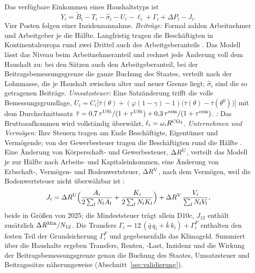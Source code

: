 Das verfügbare Einkommen eines Haushaltstyps ist
\begin{equation}
  Y_i = \tilde B_i - T_i - \hat\sigma_i - U_i - \ell_i + \Gamma_i + \Delta P_i - J_i .
  \label{eq:netto}
\end{equation}
Vier Posten folgen einer Inzidenzannahme. \emph{Beiträge:} Formal zahlen
Arbeitnehmer und Arbeitgeber je die Hälfte. Langfristig tragen die
Beschäftigten in Kontinentaleuropa rund zwei Drittel auch des
Arbeitgeberanteils \parencite{melguizo2013}. Das Modell lässt das Niveau beim
Arbeitnehmeranteil und rechnet jede Änderung voll dem Haushalt zu: bei den Sätzen
auch den Arbeitgeberanteil, bei der Beitragsbemessungsgrenze die ganze Buchung des
Staates, verteilt nach der Lohnmasse, die je Haushalt zwischen alter und neuer
Grenze liegt; $\hat\sigma_i$ sind die so getragenen Beiträge. \emph{Umsatzsteuer:} Eine Satzänderung trifft die volle
Bemessungsgrundlage,
$U_i = C_i\bigl[\bar\tau(\theta) + (\varphi(1-\gamma) - 1)\bigl(\bar\tau(\theta) - \bar\tau(\theta^0)\bigr)\bigr]$
mit dem Durchschnittssatz
$\bar\tau = 0{,}7\,\tau^{\mathrm{USt}}/(1+\tau^{\mathrm{USt}}) + 0{,}3\,\tau^{\mathrm{erm}}/(1+\tau^{\mathrm{erm}})$.
\emph{\COz:} Das Bruttoaufkommen wird vollständig überwälzt,
$\ell_i = \omega_i R^{\mathrm{CO_2}}$.
\emph{Unternehmen und Vermögen:} Ihre Steuern tragen am Ende Beschäftigte,
Eigentümer und Vermögende; von der Gewerbesteuer tragen die Beschäftigten
rund die Hälfte \parencite{fuest2018}. Eine Änderung von Körperschaft- und
Gewerbesteuer, $\Delta R^{\mathrm{U}}$, verteilt das Modell je zur Hälfte nach
Arbeits- und Kapitaleinkommen, eine Änderung von Erbschaft-, Vermögen- und
Bodenwertsteuer, $\Delta R^{\mathrm{V}}$, nach dem Vermögen, weil die
Bodenwertsteuer nicht überwälzbar ist \parencite[Kap.~16]{mirrlees2011}:
\begin{equation}
  J_i = \Delta R^{\mathrm{U}}\Bigl(\frac{A_i}{2\sum_l N_l A_l} + \frac{K_i}{2\sum_l N_l K_l}\Bigr)
      + \Delta R^{\mathrm{V}}\,\frac{V_i}{\sum_l N_l V_l},
\end{equation}
beide in Größen von 2025; die Mindeststeuer trägt allein D10c,
$J_{12}$ enthält zusätzlich $\Delta R^{\mathrm{Min}}/N_{12}$. Die Transfers
$\Gamma_i = 12\,(\bar q\,q_i + \bar k\,k_i) + \Gamma^{F}_i$ enthalten den festen Teil
der Grundsicherung $\Gamma^{F}_i$ und gegebenenfalls das Klimageld. Summiert
über die Haushalte ergeben Transfers, Renten, \COz-Last, Inzidenz und die Wirkung
der Beitragsbemessungsgrenze genau die Buchung des Staates, Umsatzsteuer und
Beitragssätze näherungsweise (Abschnitt~\ref{sec:validierung}).

